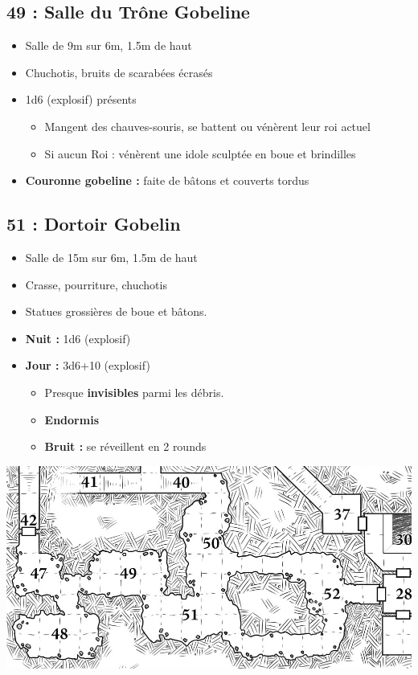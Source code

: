 \subsection{49 : Salle du Trône Gobeline}\label{n3:s49}
\begin{itemize}
  \item Salle de 9m sur 6m, 1.5m de haut
  \item Chuchotis, bruits de scarabées écrasés
  \item 1d6 (explosif) \textbf{} présents
  \begin{itemize}
    \item Mangent des chauves-souris, se battent ou vénèrent leur roi actuel
    \item Si aucun Roi : vénèrent une idole sculptée en boue et brindilles
  \end{itemize}
  \item \textbf{Couronne gobeline :} faite de bâtons et couverts tordus
\end{itemize}


\subsection{51 : Dortoir Gobelin}\label{n3:s51}
\begin{itemize}
  \item Salle de 15m sur 6m, 1.5m de haut
  \item Crasse, pourriture, chuchotis
  \item Statues grossières de boue et bâtons.
  \item \textbf{Nuit :} 1d6 (explosif) \textbf{}
  \item \textbf{Jour :} 3d6+10 (explosif) \textbf{}
  \begin{itemize}
    \item Presque \textbf{invisibles} parmi les débris.
    \item \textbf{Endormis}
    \item \textbf{Bruit :} se réveillent en 2 rounds
  \end{itemize}
\end{itemize}

\vfill
\pagebreak

\ifmulticolEnd
\begin{center}
  \includegraphics[width=\linewidth]{pics/map_47-52.jpg}
\end{center}
\ifmulticolStart

